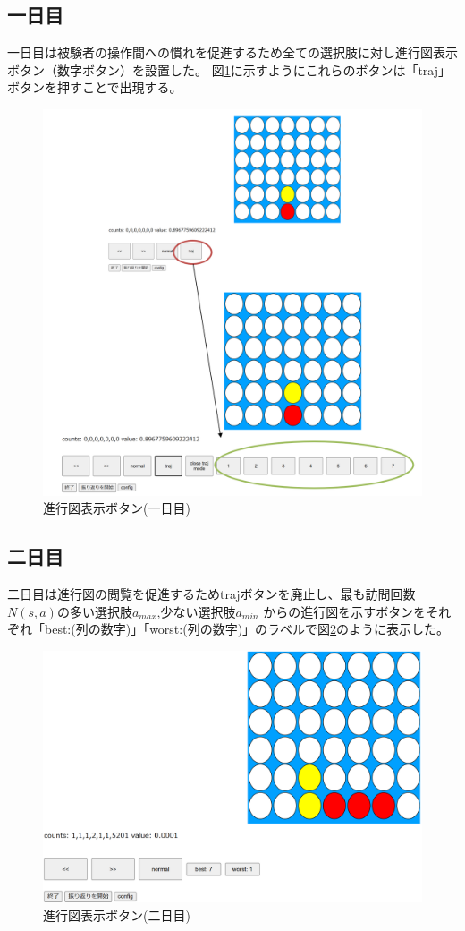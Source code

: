 \subsection{一日目}
一日目は被験者の操作間への慣れを促進するため全ての選択肢に対し進行図表示ボタン（数字ボタン）を設置した。
図\ref{fig:traj-button}に示すようにこれらのボタンは「traj」ボタンを押すことで出現する。
\begin{figure}[t]
	\centering
	\includegraphics[width=\linewidth]{./figure/traj-button.png}
	\caption{進行図表示ボタン(一日目)}
	\label{fig:traj-button}
\end{figure}
\subsection{二日目}
二日目は進行図の閲覧を促進するためtrajボタンを廃止し、最も訪問回数$N(s,a)$の多い選択肢$a_{max}$,少ない選択肢$a_{min}$
からの進行図を示すボタンをそれぞれ「best:(列の数字)」「worst:(列の数字)」のラベルで図\ref{fig:best-worst}のように表示した。
\begin{figure}[t]
	\centering
	\includegraphics[width=\linewidth]{./figure/best-worst.png}
	\caption{進行図表示ボタン(二日目)}
	\label{fig:best-worst}
\end{figure}
